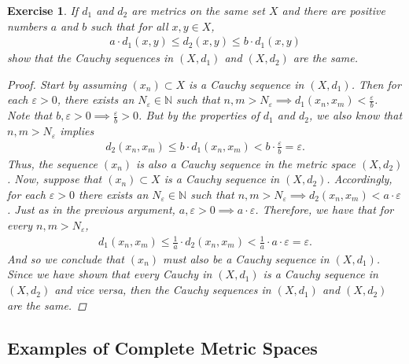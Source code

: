 \documentclass[11pt]{article}
\theoremstyle{mystyle}
\newtheorem{protoexer}{Exercise}[section]
\newenvironment{exer}
{\colorlet{shadecolor}{blue!15}\begin{shaded}\begin{protoexer}}
{\end{protoexer}\end{shaded}}
\newcommand{\0}{\mathbf{0}}
\begin{document}
\begin{exer}\label{equivalentmetrics}
If $d_1$ and $d_2$ are metrics on the same set $X$ and there are positive numbers $a$ and $b$ such that for all $x, y \in X$,
\begin{align*}
    a \cdot d_1(x, y) \leq d_2(x, y) \leq b \cdot d_1(x, y)
\end{align*}
show that the Cauchy sequences in $(X, d_1)$ and $(X, d_2)$ are the same.
\begin{proof}
Start by assuming $(x_n) \subset X$ is a Cauchy sequence in $(X, d_1)$. Then for each $\varepsilon > 0$, there exists an $N_{\varepsilon} \in \mathbb{N}$ such that $n, m > N_{\varepsilon} \implies d_1(x_n, x_m) < \frac{\varepsilon}{b}$. Note that $b, \varepsilon > 0 \implies \frac{\varepsilon}{b} > 0$. But by the properties of $d_1$ and $d_2$, we also know that $n, m > N_{\varepsilon}$ implies
\begin{align*}
    d_2(x_n, x_m) \leq b \cdot d_1(x_n, x_m) < b \cdot \frac{\varepsilon}{b} = \varepsilon.
\end{align*}
Thus, the sequence $(x_n)$ is also a Cauchy sequence in the metric space $(X, d_2)$.\newline
Now, suppose that $(x_n) \subset X$ is a Cauchy sequence in $(X, d_2)$. Accordingly, for each $\varepsilon > 0$ there exists an $N_{\varepsilon} \in \mathbb{N}$ such that $n, m > N_{\varepsilon} \implies d_2(x_n, x_m) < a \cdot \varepsilon$. Just as in the previous argument, $a, \varepsilon > 0 \implies a \cdot \varepsilon$. Therefore, we have that for every $n, m > N_{\varepsilon}$, 
\begin{align*}
    d_1(x_n, x_m) \leq \frac{1}{a} \cdot d_2(x_n, x_m) < \frac{1}{a} \cdot a \cdot \varepsilon = \varepsilon.
\end{align*}
And so we conclude that $(x_n)$ must also be a Cauchy sequence in $(X, d_1)$.\newline
Since we have shown that every Cauchy in $(X, d_1)$ is a Cauchy sequence in $(X, d_2)$ and vice versa, then the Cauchy sequences in $(X, d_1)$ and $(X, d_2)$ are the same. 
\end{proof}
\end{exer}

\subsection{Examples of Complete Metric Spaces}
\end{document}

